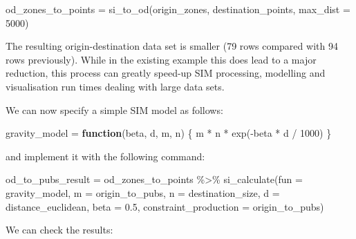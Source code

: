 \documentclass[11pt,letterpaper]{article}
\newenvironment{Shaded}{\begin{snugshade}}{\end{snugshade}}
\newcommand{\AttributeTok}[1]{\textcolor[rgb]{0.77,0.63,0.00}{#1}}
\newcommand{\ControlFlowTok}[1]{\textcolor[rgb]{0.13,0.29,0.53}{\textbf{#1}}}
\newcommand{\DecValTok}[1]{\textcolor[rgb]{0.00,0.00,0.81}{#1}}
\newcommand{\FloatTok}[1]{\textcolor[rgb]{0.00,0.00,0.81}{#1}}
\newcommand{\FunctionTok}[1]{\textcolor[rgb]{0.00,0.00,0.00}{#1}}
\newcommand{\NormalTok}[1]{#1}
\newcommand{\OtherTok}[1]{\textcolor[rgb]{0.56,0.35,0.01}{#1}}
\newcommand{\SpecialCharTok}[1]{\textcolor[rgb]{0.00,0.00,0.00}{#1}}
\begin{document}
\begin{Shaded}
\begin{Highlighting}[]
\NormalTok{od\_zones\_to\_points }\OtherTok{=} \FunctionTok{si\_to\_od}\NormalTok{(origin\_zones, }
\NormalTok{                              destination\_points, }
                              \AttributeTok{max\_dist =} \DecValTok{5000}\NormalTok{)}
\end{Highlighting}
\end{Shaded}

The resulting origin-destination data set is smaller (79 rows compared with 94 rows previously).
While in the existing example this does lead to a major reduction, this process can greatly speed-up SIM processing, modelling and visualisation run times dealing with large data sets.

We can now specify a simple SIM model as follows:

\begin{Shaded}
\begin{Highlighting}[]
\NormalTok{gravity\_model }\OtherTok{=} \ControlFlowTok{function}\NormalTok{(beta, d, m, n) \{}
\NormalTok{  m }\SpecialCharTok{*}\NormalTok{ n }\SpecialCharTok{*} \FunctionTok{exp}\NormalTok{(}\SpecialCharTok{{-}}\NormalTok{beta }\SpecialCharTok{*}\NormalTok{ d }\SpecialCharTok{/} \DecValTok{1000}\NormalTok{)}
\NormalTok{\} }
\end{Highlighting}
\end{Shaded}

and implement it with the following command:

\begin{Shaded}
\begin{Highlighting}[]
\NormalTok{od\_to\_pubs\_result }\OtherTok{=}\NormalTok{ od\_zones\_to\_points }\SpecialCharTok{\%\textgreater{}\%} 
  \FunctionTok{si\_calculate}\NormalTok{(}\AttributeTok{fun =}\NormalTok{ gravity\_model, }
               \AttributeTok{m =}\NormalTok{ origin\_to\_pubs,}
               \AttributeTok{n =}\NormalTok{ destination\_size,}
               \AttributeTok{d =}\NormalTok{ distance\_euclidean,}
               \AttributeTok{beta =} \FloatTok{0.5}\NormalTok{,}
               \AttributeTok{constraint\_production =}\NormalTok{ origin\_to\_pubs)}
\end{Highlighting}
\end{Shaded}

We can check the results:

\begin{Shaded}
\end{Shaded}
\end{document}
